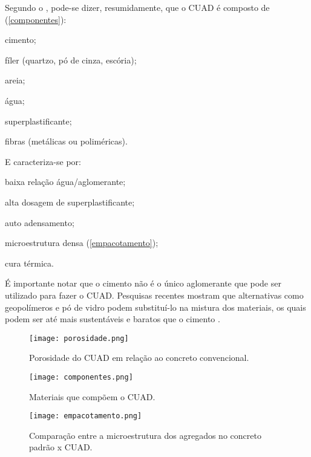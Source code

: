 Segundo o , pode-se dizer, resumidamente, que o CUAD é composto de (\autoref{componentes}): 

\begin{alineas}[label=\textbullet]
  \item cimento;
  \item fíler (quartzo, pó de cinza, escória);
  \item areia;
  \item água;
  \item superplastificante;
  \item fibras (metálicas ou poliméricas).
\end{alineas}

E caracteriza-se por:

\begin{alineas}[label=\textbullet]
  \item baixa relação água/aglomerante;
  \item alta dosagem de superplastificante;
  \item auto adensamento;
  \item microestrutura densa (\autoref{empacotamento});
  \item cura térmica.
\end{alineas}

É importante notar que o cimento não é o único aglomerante que pode ser utilizado para fazer o CUAD. Pesquisas recentes mostram que alternativas como geopolímeros e pó de vidro podem substituí-lo na mistura dos materiais, os quais podem ser até mais sustentáveis e baratos que o cimento \cite{Goldoni} \cite{Soliman}.

\begin{figure}[htb]
	\caption{\label{porosidade}Porosidade do CUAD em relação ao concreto convencional.}
	\begin{center}
	    \texttt{[image: porosidade.png]}
	\end{center}
\end{figure}

\begin{figure}[htb]
	\caption{\label{componentes}Materiais que compõem o CUAD.}
	\begin{center}
	    \texttt{[image: componentes.png]}
	\end{center}
\end{figure}

\begin{figure}[htb]
	\caption{\label{empacotamento}Comparação entre a microestrutura dos agregados no concreto padrão x CUAD.}
	\begin{center}
	    \texttt{[image: empacotamento.png]}
	\end{center}
\end{figure}

